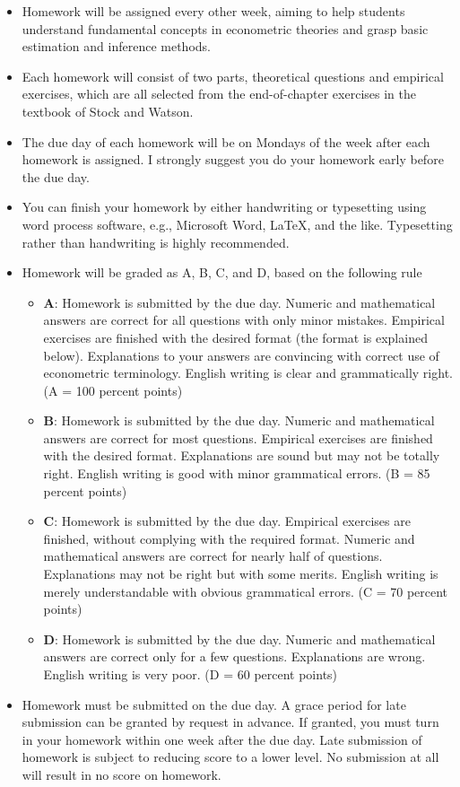 \documentclass[a4paper,11pt]{article}
\begin{document}
\begin{itemize}
\item Homework will be assigned every other week, aiming to help students
understand fundamental concepts in econometric theories and grasp
basic estimation and inference methods.

\item Each homework will consist of two parts, theoretical questions and
empirical exercises, which are all selected from the end-of-chapter
exercises in the textbook of Stock and Watson.

\item The due day of each homework will be on Mondays of the week after
each homework is assigned. I strongly suggest you do your homework
early before the due day.

\item You can finish your homework by either handwriting or typesetting
using word process software, e.g., Microsoft Word, \LaTeX{}, and the
like. Typesetting rather than handwriting is highly recommended.

\item Homework will be graded as A, B, C, and D, based on the following
rule
\begin{itemize}
\item \textbf{A}: Homework is submitted by the due day. Numeric and mathematical
answers are correct for all questions with only minor
mistakes. Empirical exercises are finished with the desired
format (the format is explained below). Explanations to your
answers are convincing with correct use of econometric
terminology. English writing is clear and grammatically right. (A
= 100 percent points)
\item \textbf{B}: Homework is submitted by the due day. Numeric and
mathematical answers are correct for most questions. Empirical
exercises are finished with the desired format. Explanations are
sound but may not be totally right. English writing is good with
minor grammatical errors. (B = 85 percent points)
\item \textbf{C}: Homework is submitted by the due day. Empirical exercises
are finished, without complying with the required format. Numeric
and mathematical answers are correct for nearly half of
questions. Explanations may not be right but with some
merits. English writing is merely understandable with obvious
grammatical errors. (C = 70 percent points)
\item \textbf{D}: Homework is submitted by the due day. Numeric and
mathematical answers are correct only for a few
questions. Explanations are wrong. English writing is very
poor. (D = 60 percent points)
\end{itemize}

\item Homework must be submitted on the due day. A grace period for late
submission can be granted by request in advance. If granted, you
must turn in your homework within one week after the due day. Late
submission of homework is subject to reducing score to a lower
level. No submission at all will result in no score on homework.
\end{itemize}
\end{document}
